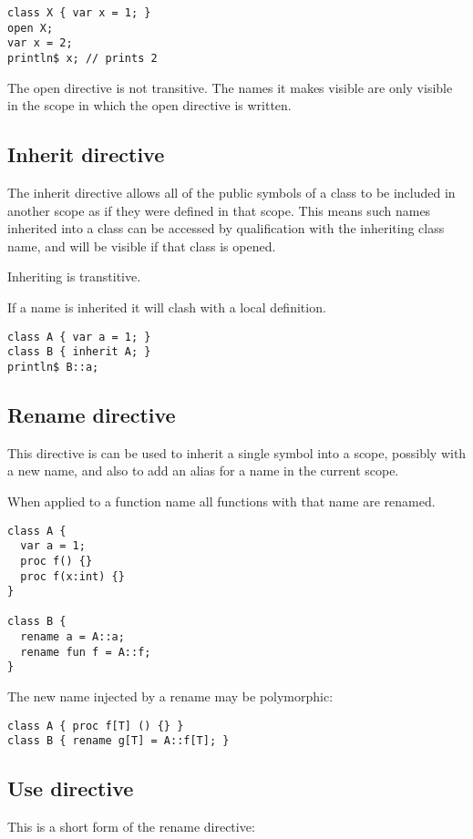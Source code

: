 \documentclass[oneside]{book}
\begin{document}
\begin{verbatim}
class X { var x = 1; }
open X;
var x = 2;
println$ x; // prints 2
\end{verbatim}


The open directive is not transitive.
The names it makes visible are only visible
in the scope in which the open directive is written.

\subsection{Inherit directive}
The inherit directive allows all of the public symbols
of a class to be included in another scope as if they
were defined in that scope. This means such names
inherited into a class can be accessed by qualification
with the inheriting class name, and will be visible
if that class is opened. 

Inheriting is transtitive.

If a name is inherited it will clash with a local definition.

\begin{verbatim}
class A { var a = 1; }
class B { inherit A; }
println$ B::a;
\end{verbatim}


\subsection{Rename directive}
This directive is can be used to inherit a single
symbol into a scope, possibly with a new name,
and also to add an alias for a name in the current
scope.

When applied to a function name all functions with
that name are renamed.


\begin{verbatim}
class A { 
  var a = 1; 
  proc f() {} 
  proc f(x:int) {} 
}

class B { 
  rename a = A::a;
  rename fun f = A::f;
}
\end{verbatim}

The new name injected by a rename may be polymorphic:

\begin{verbatim}
class A { proc f[T] () {} }
class B { rename g[T] = A::f[T]; } 
\end{verbatim}

\subsection{Use directive}
This is a short form of the rename directive:
\end{document}
